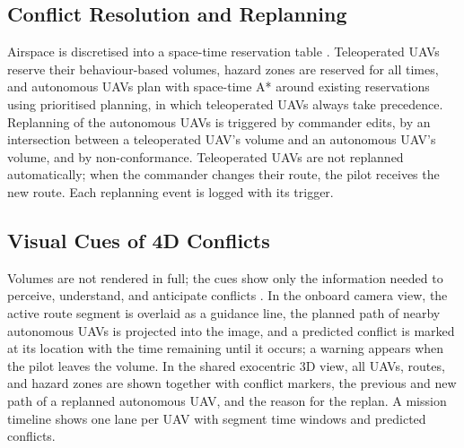 \documentclass{article}
\begin{document}
\subsection{Conflict Resolution and Replanning}
Airspace is discretised into a space-time reservation table \cite{silver2005}.
Teleoperated UAVs reserve their behaviour-based volumes, hazard zones are reserved for all times, and autonomous UAVs plan with space-time A* around existing reservations using prioritised planning, in which teleoperated UAVs always take precedence.
Replanning of the autonomous UAVs is triggered by commander edits, by an intersection between a teleoperated UAV's volume and an autonomous UAV's volume, and by non-conformance.
Teleoperated UAVs are not replanned automatically; when the commander changes their route, the pilot receives the new route.
Each replanning event is logged with its trigger.

\subsection{Visual Cues of 4D Conflicts}
Volumes are not rendered in full; the cues show only the information needed to perceive, understand, and anticipate conflicts \cite{endsley1995}.
In the onboard camera view, the active route segment is overlaid as a guidance line, the planned path of nearby autonomous UAVs is projected into the image, and a predicted conflict is marked at its location with the time remaining until it occurs; a warning appears when the pilot leaves the volume.
In the shared exocentric 3D view, all UAVs, routes, and hazard zones are shown together with conflict markers, the previous and new path of a replanned autonomous UAV, and the reason for the replan.
A mission timeline shows one lane per UAV with segment time windows and predicted conflicts.
\end{document}
